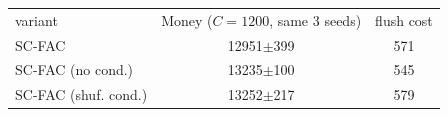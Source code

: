 \begin{tabular}{lcc}
\hline
variant & Money ($C{=}1200$, same 3 seeds) & flush cost\\
SC-FAC & 12951$\pm$399 & 571\\
SC-FAC (no cond.) & 13235$\pm$100 & 545\\
SC-FAC (shuf. cond.) & 13252$\pm$217 & 579\\
\hline
\end{tabular}